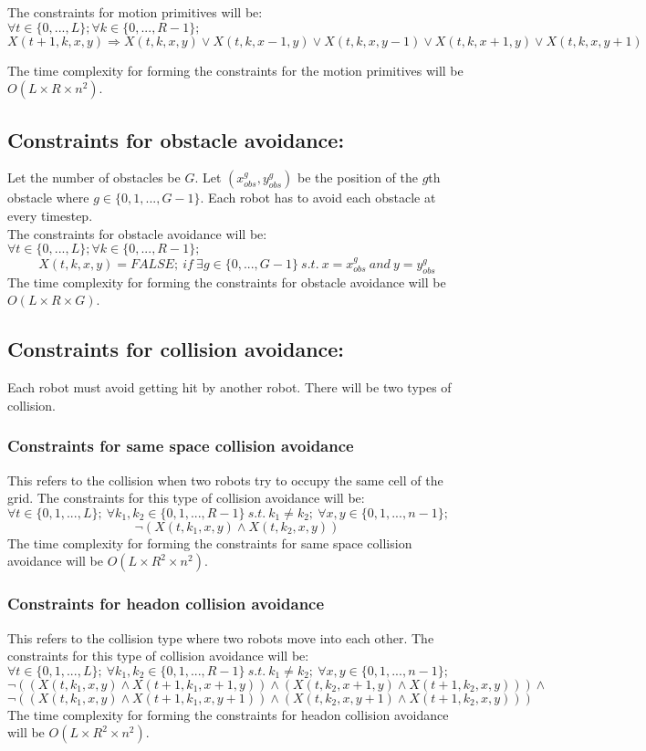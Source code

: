 \documentclass{article}[11pt]
\begin{document}
			The constraints for motion primitives will be:\\
			$\forall{t \in \{0,...,L\}};\forall{k \in \{0,...,R-1\}};$
			$$
				X(t+1, k, x, y) \Rightarrow X(t,k,x,y)\vee X(t,k,x-1,y)\vee X(t,k,x,y-1)\vee X(t,k,x+1,y)\vee X(t,k,x,y+1)
			$$

			The time complexity for forming the constraints for the motion primitives will be $O(L \times R\times n^2)$.

		\subsection{Constraints for obstacle avoidance:}
			Let the number of obstacles be $G$. Let $(x_{obs}^g, y_{obs}^g)$ be the position of the $g$th obstacle where $g \in \{0, 1, . . . , G-1\}$. Each robot has to avoid each obstacle at every timestep.\\
			The constraints for obstacle avoidance will be:\\
			$\forall{t \in \{0,...,L\}};\forall{k \in \{0,...,R-1\}};$
			$$
				X(t, k, x, y) = FALSE;\ if\ \exists g \in \{0,...,G-1\}\ s.t.\ x=x_{obs}^g\ and\ y=y_{obs}^g
			$$
			The time complexity for forming the constraints for obstacle avoidance will be $O(L \times R\times G)$.

		\subsection{Constraints for collision avoidance:}
			Each robot must avoid getting hit by another robot. There will be two types of collision.
			\subsubsection{Constraints for same space collision avoidance}
				This refers to the collision when two robots try to occupy the same cell of the grid. The constraints for this type of collision avoidance will be:\\
				$\forall t \in \{0, 1, ..., L\};\ \forall k_1,k_2 \in \{0, 1, ..., R-1\}\ s.t.\ k_1 \neq k_2;\ \forall x,y \in \{0,1,...,n-1\};$
				$$
					\neg (X(t, k_1, x, y) \wedge X(t, k_2, x, y))
				$$
				The time complexity for forming the constraints for same space collision avoidance will be
				$O(L \times R^2 \times n^2)$.
			\subsubsection{Constraints for headon collision avoidance}
				This refers to the collision type where two robots move into each other. The constraints for this type of collision avoidance will be:\\
				$\forall t \in \{0, 1, ..., L\};\ \forall k_1,k_2 \in \{0, 1, ..., R-1\}\ s.t.\ k_1 \neq k_2;\ \forall x,y \in \{0,1,...,n-1\};$
				$$
					\neg((X(t, k_1, x, y) \wedge X(t+1, k_1, x+1, y)) \wedge (X(t, k_2, x+1, y) \wedge X(t+1, k_2, x, y))) \wedge
				$$
				$$
					\neg((X(t, k_1, x, y) \wedge X(t+1, k_1, x, y+1)) \wedge (X(t, k_2, x, y+1) \wedge X(t+1, k_2, x, y)))
				$$
				The time complexity for forming the constraints for headon collision avoidance will be
				$O(L \times R^2 \times n^2)$.
\end{document}
